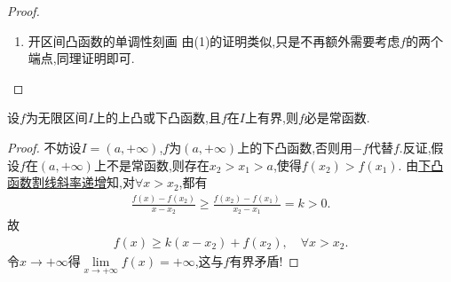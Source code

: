 \documentclass[../../main.tex]{subfiles}%
\begin{document}
\begin{proof}
\begin{enumerate}
于是再结合\eqref{proposition6.17-13.23}可知

(i)当\(\overline{f}\)的最小值\(c = b\)时，若\(f(b)>\overline{f}(b)\)，则\(f\)只在\([a,b)\)上单调递减；若\(f(b)=\overline{f}(b)\)，则\(f\)在\([a,b]\)上单调递减. 故此时无论如何，\(f\)一定在\([a,b)\)上单调递减.

(ii)当\(\overline{f}\)的最小值\(c = a\)时，若\(f(a)>\overline{f}(a)\)，则\(f\)只在\((a,b]\)上单调递增；若\(f(a)=\overline{f}(a)\)，则\(f\)在\([a,b]\)上单调递增. 故此时无论如何，\(f\)一定在\((a,b]\)上单调递增.

(iii)当\(\overline{f}\)的最小值\(c\in(a,b)\)时，\(f\)的单调性与\(\overline{f}\)相同,即\(f\)在\([c,b]\)递增,在\([a,c]\)递减.

因此结论得证.

\item {\heiti 开区间凸函数的单调性刻画}
由(1)的证明类似,只是不再额外需要考虑$f$的两个端点,同理证明即可.
\end{enumerate}
\end{proof}

\begin{proposition}[无穷区间上的有界凸函数必为常函数]\label{proposition:无穷区间上的有界凸函数必为常函数}
设$f$为无限区间$I$上的上凸或下凸函数,且$f$在$I$上有界,则$f$必是常函数.
\end{proposition}
\begin{proof}
不妨设$I=(a,+\infty)$,$f$为$(a,+\infty)$上的下凸函数,否则用$-f$代替$f$.反证,假设$f$在$(a,+\infty)$上不是常函数,则存在$x_2>x_1>a$,使得$f(x_2) >f(x_1)$.
由\hyperref[proposition:下凸函数的基本性质]{下凸函数割线斜率递增}知,对$\forall x>x_2$,都有
\begin{align*}
\frac{f(x) -f(x_2)}{x-x_2}\geqslant \frac{f(x_2) -f(x_1)}{x_2-x_1}=k>0.
\end{align*}
故
\begin{align*}
f(x) \geqslant k(x-x_2) +f(x_2),\quad \forall x>x_2.
\end{align*}
令$x\rightarrow +\infty$得$\lim\limits_{x\rightarrow +\infty}f(x) =+\infty$,这与$f$有界矛盾!
\end{proof}
\end{document}
